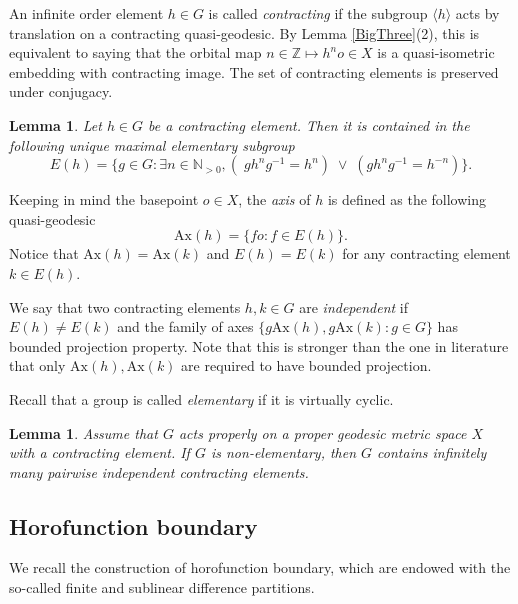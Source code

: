 \documentclass{amsart}
\newtheorem{lem}[thm]{Lemma}
\theoremstyle{definition}
\theoremstyle{remark}
\newcommand{\U}{ X}
\newcommand{\ax}{\mathrm{Ax}}
\begin{document}
An infinite order element $h \in G$ is called  
\textit{contracting} if the subgroup $\langle h \rangle$ acts by translation on a  contracting quasi-geodesic. By Lemma \ref{BigThree}(2), this is equivalent to saying that the orbital map $n\in \mathbb Z\mapsto h^no\in X$ is a quasi-isometric embedding with contracting image.  The set of contracting elements is preserved under conjugacy. %



\begin{lem}\cite[Lemma 2.11]{YANG10}\label{elementarygroup}
Let $h\in G$ be a contracting element. Then it is contained in the following unique maximal elementary subgroup
$$
E(h)=\{g\in G: \exists n\in \mathbb N_{> 0}, (\;gh^ng^{-1}=h^n)\; \lor\;  (gh^ng^{-1}=h^{-n})\}.
$$
\end{lem}

Keeping in mind the basepoint $o\in\U$, the \textit{axis} of $h$  is defined as the following quasi-geodesic 
\begin{equation}\label{axisdefn}
\ax(h)=\{f o: f\in E(h)\}.
\end{equation} Notice that $\ax(h)=\ax(k)$ and $E(h)=E(k)$    for any contracting element   $k\in E(h)$.

We say that two contracting elements $h,k\in G$ are \textit{independent} if $E(h)\ne E(k)$ and the family of axes $\{g\ax(h), g\ax(k): g\in G\}$ has bounded projection property. Note that this is stronger than the one in literature that only $\ax(h), \ax(k)$ are required to have bounded projection. 

Recall that a group is called \textit{elementary} if it is virtually cyclic.
\begin{lem}\cite[Lemma 4.6]{YANG6}\label{lem:manycontractingelements}
Assume that $G$ acts properly on a proper geodesic metric space $X$ with a contracting element. If $G$ is non-elementary, then $G$ contains infinitely many pairwise independent contracting elements.     
\end{lem}

\subsection{Horofunction boundary}\label{subsec: horofunction boundary}
We  recall the construction of horofunction boundary, which are endowed with the so-called finite and sublinear  difference partitions. 
\end{document}
